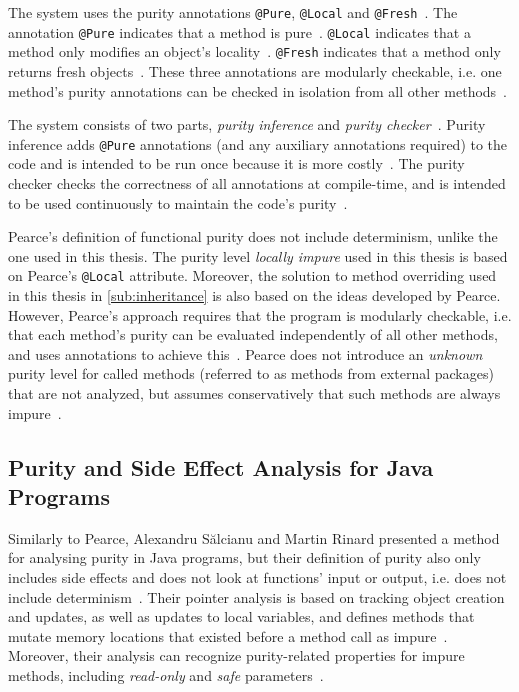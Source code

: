 \documentclass[a4paper,12pt]{article}
\begin{document}
The system uses the purity annotations \texttt{@Pure}, \texttt{@Local} and \texttt{@Fresh}~\cite{pearce2011jpure}. The annotation \texttt{@Pure} indicates that a method is pure~\cite{pearce2011jpure}. \texttt{@Local} indicates that a method only modifies an object's locality~\cite{pearce2011jpure}. \texttt{@Fresh} indicates that a method only returns fresh objects~\cite{pearce2011jpure}. These three annotations are modularly checkable, i.e. one method's purity annotations can be checked in isolation from all other methods~\cite{pearce2011jpure}.

The system consists of two parts, \textit{purity inference} and \textit{purity checker}~\cite{pearce2011jpure}. Purity inference adds \texttt{@Pure} annotations (and any auxiliary annotations required) to the code and is intended to be run once because it is more costly~\cite{pearce2011jpure}. The purity checker checks the correctness of all annotations at compile-time, and is intended to be used continuously to maintain the code's purity~\cite{pearce2011jpure}.

Pearce's definition of functional purity does not include determinism, unlike the one used in this thesis. The purity level \textit{locally impure} used in this thesis is based on Pearce's \texttt{@Local} attribute. Moreover, the solution to method overriding used in this thesis in \autoref{sub:inheritance} is also based on the ideas developed by Pearce. However, Pearce's approach requires that the program is modularly checkable, i.e. that each method's purity can be evaluated independently of all other methods, and uses annotations to achieve this~\cite{pearce2011jpure}.  Pearce does not introduce an \textit{unknown} purity level for called methods (referred to as methods from external packages) that are not analyzed, but assumes conservatively that such methods are always impure~\cite{pearce2011jpure}.


\subsection{Purity and Side Effect Analysis for Java Programs} \label{sub:Purity and Side Effect Analysis for Java Programs}

Similarly to Pearce, Alexandru S\u{a}lcianu and Martin Rinard presented a method for analysing purity in Java programs, but their definition of purity also only includes side effects and does not look at functions' input or output, i.e. does not include determinism~\cite{salcianu}. Their pointer analysis is based on tracking object creation and updates, as well as updates to local variables, and defines methods that mutate memory locations that existed before a method call as impure~\cite{salcianu}. Moreover, their analysis can recognize purity-related properties for impure methods, including \textit{read-only} and \textit{safe} parameters~\cite{salcianu}.
\end{document}
